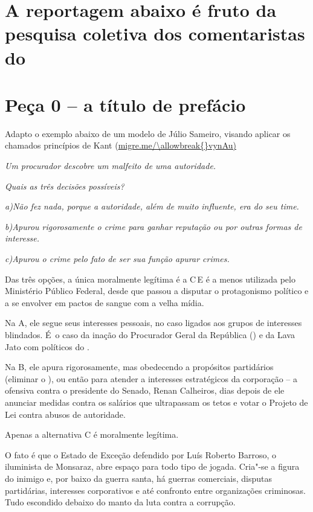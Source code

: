 

\section{A reportagem abaixo é fruto da pesquisa coletiva dos
comentaristas do  ~}

\section{Peça 0 -- a título de prefácio}

Adapto o exemplo abaixo de um modelo de Júlio Sameiro, visando aplicar
os chamados princípios de Kant (\url{migre.me/\allowbreak{}vynAu)}

\emph{Um procurador descobre um malfeito de uma autoridade.}

\emph{Quais as três decisões possíveis?}

\emph{a)Não fez nada, porque a autoridade, além de muito influente, era
do seu time.}

\emph{b)Apurou rigorosamente o crime para ganhar reputação ou por outras
formas de interesse.}

\emph{c)Apurou o crime pelo fato de ser sua função apurar crimes.}

Das três opções, a única moralmente legítima é a C\,E é a menos
utilizada pelo Ministério Público Federal, desde que passou a disputar o
protagonismo político e a se envolver em pactos de sangue com a velha
mídia.

Na A, ele segue seus interesses pessoais, no caso ligados aos grupos de
interesses blindados. É~o caso da inação do Procurador Geral da
República () e da Lava Jato com políticos do .

Na B, ele apura rigorosamente, mas obedecendo a propósitos partidários
(eliminar o ), ou então para atender a interesses estratégicos da
corporação -- a ofensiva contra o presidente do Senado, Renan Calheiros,
dias depois de ele anunciar medidas contra os salários que ultrapassam
os tetos e votar o Projeto de Lei contra abusos de autoridade.

Apenas a alternativa C é moralmente legítima.

O fato é que o Estado de Exceção defendido por Luís Roberto Barroso, o
iluminista de Monsaraz, abre espaço para todo tipo de jogada. Cria"-se a
figura do inimigo e, por baixo da guerra santa, há guerras comerciais,
disputas partidárias, interesses corporativos e até confronto entre
organizações criminosas. Tudo escondido debaixo do manto da luta contra
a corrupção.

